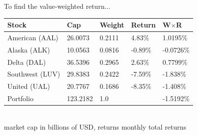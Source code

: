 To find the value-weighted return...
\begin{center}
	{\color{blue}
	\begin{tabular}{l|llll}
		\textbf{Stock} & \textbf{Cap} & \textbf{W}eight & \textbf{R}eturn & \textbf{W$\times$R}\\ \hline
		American (AAL) & 26.0073 & 0.2111 & 4.83\% & 1.0195\% \\
		Alaska (ALK) & 10.0563 & 0.0816 & -0.89\% & -0.0726\% \\
		Delta (DAL) & 36.5396 & 0.2965 & 2.63\% & 0.7799\% \\
		Southwest (LUV) & 29.8383 & 0.2422 & -7.59\% & -1.838\% \\
		United (UAL) & 20.7767 & 0.1686 & -8.35\% & -1.408\% \\ \hline 
		Portfolio & 123.2182 & 1.0 & & -1.5192\%\\\hline
	\end{tabular}
	}\\
	{\footnotesize market cap in billions of USD, returns monthly total returns}
\end{center}